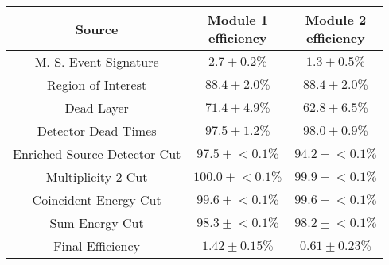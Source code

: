 \begin{tabular}{|c|c|c|}
\hline
  Source & \makecell{Module 1\\efficiency} & \makecell{Module 2\\efficiency} \\
\hline
  M. S. Event Signature & $2.7 \pm 0.2\%$ & $1.3 \pm 0.5\%$ \\
  Region of Interest & $88.4 \pm 2.0\%$ & $88.4 \pm 2.0\%$ \\
  Dead Layer & $71.4 \pm 4.9\%$ & $62.8 \pm 6.5\%$ \\
  Detector Dead Times & $97.5 \pm 1.2\%$ & $98.0 \pm 0.9\%$ \\
  Enriched Source Detector Cut & $97.5 \pm{}<\!0.1\%$ & $94.2 \pm{}<\!0.1\%$ \\
  Multiplicity 2 Cut & $100.0 \pm{}<\!0.1\%$ & $99.9 \pm{}<\!0.1\%$ \\
  Coincident Energy Cut & $99.6 \pm{}<\!0.1\%$ & $99.6 \pm{}<\!0.1\%$ \\
  Sum Energy Cut & $98.3 \pm{}<\!0.1\%$ & $98.2 \pm{}<\!0.1\%$ \\
  \hline Final Efficiency & $1.42 \pm 0.15\%$ & $0.61 \pm 0.23\%$ \\
\hline
\end{tabular}
